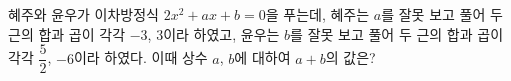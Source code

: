 혜주와 윤우가 이차방정식 $2x^2+ax+b=0$을 푸는데, 혜주는 $a$를 잘못 보고 풀어 두 근의 합과 곱이 각각 $-3$, $3$이라 하였고, 윤우는 $b$를 잘못 보고 풀어 두 근의 합과 곱이 각각 $\dfrac{5}{2}$, $-6$이라 하였다. 이때 상수 $a$, $b$에 대하여 $a+b$의 값은?
